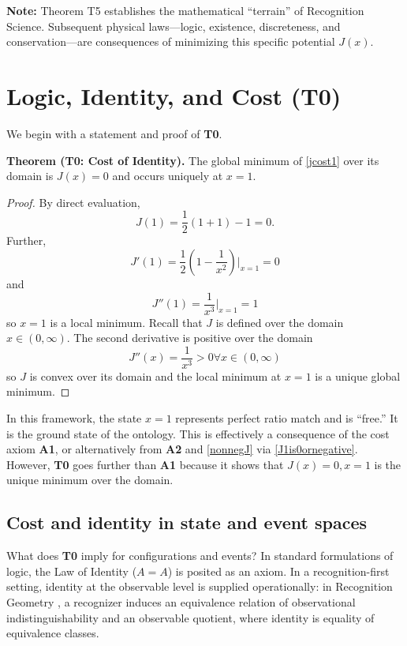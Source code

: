 \documentclass[11pt,a4paper]{article}
\begin{document}
\noindent \textbf{Note:} Theorem T5 establishes the mathematical ``terrain'' of Recognition Science. Subsequent physical laws—logic, existence, discreteness, and conservation—are consequences of minimizing this specific potential $J(x)$.

\section{Logic, Identity, and Cost (T0)}
We begin with a statement and proof of \textbf{T0}.

\textbf{Theorem (T0: Cost of Identity).}
The global minimum of \ref{jcost1} over its domain is $J(x)=0$ and occurs uniquely at $x=1$.
\begin{proof}
By direct evaluation,
\begin{equation}
    J(1) = \frac{1}{2}(1 + 1) - 1 = 0.\label{jmin}
\end{equation}
Further,
\begin{equation}
    J'(1)=\frac{1}{2}(1-\frac{1}{x^2})|_{x=1}=0
\end{equation}
and 
\begin{equation}
    J''(1)=\frac{1}{x^3}|_{x=1}=1
\end{equation}
so $x=1$ is a local minimum. 
Recall that $J$ is defined over the domain $x\in(0,\infty)$. The second derivative is positive over the domain
\begin{equation}
    J''(x)=\frac{1}{x^3}>0\forall x\in(0,\infty)
\end{equation}
so $J$ is convex over its domain and the local minimum at $x=1$ is a unique global minimum.
\end{proof}


In this framework, the state $x=1$ represents perfect ratio match and is ``free.'' It is the ground state of the ontology. This is effectively a consequence of the cost axiom \textbf{A1}, or alternatively from \textbf{A2} and \ref{nonnegJ} via \ref{J1is0ornegative}. However, \textbf{T0} goes further than \textbf{A1} because it shows that $J(x)=0,x=1$ is the unique minimum over the domain.
\subsection{Cost and identity in state and event spaces}
What does \textbf{T0} imply for configurations and events? In standard formulations of logic, the Law of Identity ($A=A$) is posited as an axiom. In a recognition-first setting, identity at the observable level is supplied operationally: in Recognition Geometry \cite{RecognitionGeometry}, a recognizer induces an equivalence relation of observational indistinguishability and an observable quotient, where identity is equality of equivalence classes. 
\end{document}
